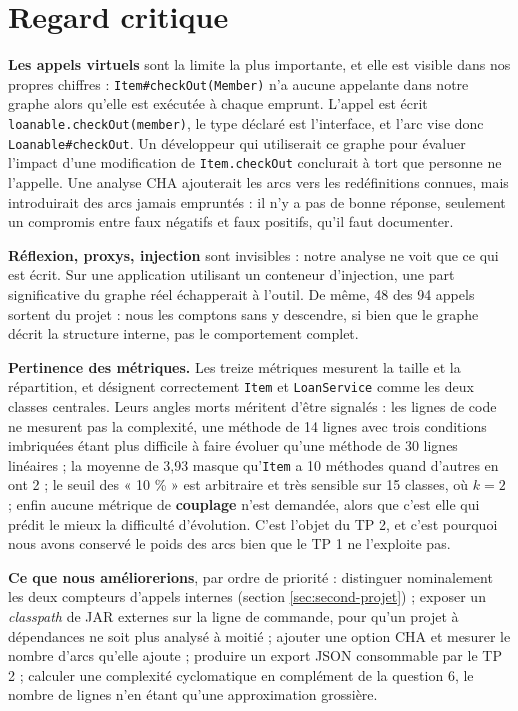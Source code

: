 \documentclass[11pt,a4paper]{article}
\begin{document}
\section{Regard critique}
\label{sec:critique}

\textbf{Les appels virtuels} sont la limite la plus importante, et elle est visible dans nos propres chiffres : \texttt{Item\#checkOut(Member)} n'a aucune appelante dans notre graphe alors qu'elle est exécutée à chaque emprunt. L'appel est écrit \texttt{loanable.checkOut(member)}, le type déclaré est l'interface, et l'arc vise donc \texttt{Loanable\#checkOut}. Un développeur qui utiliserait ce graphe pour évaluer l'impact d'une modification de \texttt{Item.checkOut} conclurait à tort que personne ne l'appelle. Une analyse CHA ajouterait les arcs vers les redéfinitions connues, mais introduirait des arcs jamais empruntés : il n'y a pas de bonne réponse, seulement un compromis entre faux négatifs et faux positifs, qu'il faut documenter.

\textbf{Réflexion, proxys, injection} sont invisibles : notre analyse ne voit que ce qui est écrit. Sur une application utilisant un conteneur d'injection, une part significative du graphe réel échapperait à l'outil. De même, 48 des 94 appels sortent du projet : nous les comptons sans y descendre, si bien que le graphe décrit la structure interne, pas le comportement complet.

\textbf{Pertinence des métriques.} Les treize métriques mesurent la taille et la répartition, et désignent correctement \texttt{Item} et \texttt{LoanService} comme les deux classes centrales. Leurs angles morts méritent d'être signalés : les lignes de code ne mesurent pas la complexité, une méthode de 14 lignes avec trois conditions imbriquées étant plus difficile à faire évoluer qu'une méthode de 30 lignes linéaires ; la moyenne de 3,93 masque qu'\texttt{Item} a 10 méthodes quand d'autres en ont 2 ; le seuil des « 10 \% » est arbitraire et très sensible sur 15 classes, où $k = 2$ ; enfin aucune métrique de \textbf{couplage} n'est demandée, alors que c'est elle qui prédit le mieux la difficulté d'évolution. C'est l'objet du TP 2, et c'est pourquoi nous avons conservé le poids des arcs bien que le TP 1 ne l'exploite pas.

\textbf{Ce que nous améliorerions}, par ordre de priorité : distinguer nominalement les deux compteurs d'appels internes (section \ref{sec:second-projet}) ; exposer un \textit{classpath} de JAR externes sur la ligne de commande, pour qu'un projet à dépendances ne soit plus analysé à moitié ; ajouter une option CHA et mesurer le nombre d'arcs qu'elle ajoute ; produire un export JSON consommable par le TP 2 ; calculer une complexité cyclomatique en complément de la question 6, le nombre de lignes n'en étant qu'une approximation grossière.
\end{document}
